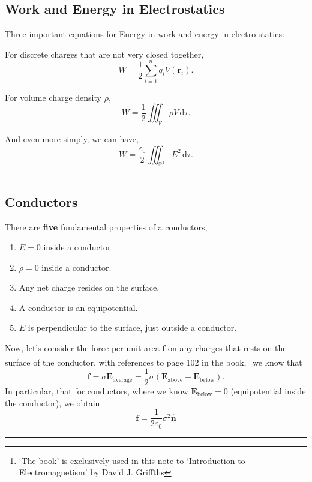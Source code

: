 \documentclass[a4paper]{article}
\newcommand{\dmr}[1]{\, \mathrm{d}#1} %
\numberwithin{equation}{subsection}
\let\oldhat\hat
\renewcommand{\vec}[1]{\mathbf{#1}}
\renewcommand{\hat}[1]{\oldhat{\mathbf{#1}}}
\begin{document}
\subsection{Work and Energy in Electrostatics}
Three important equations for Energy in work and energy in electro statics:
\par For discrete charges that are not very closed together,
\begin{equation}
    W = \frac{1}{2} \sum_{i = 1}^{n}q_i V(\vec{r}_i).
\end{equation}
\par For volume charge density $\rho$, 
\begin{equation}
    W = \frac12 \iiint_{\mathcal{V}} \rho V \dmr{\tau}.
\end{equation}
\par And even more simply, we can have,
\begin{equation}
    W = \frac{\varepsilon_0}{2}\iiint_{\mathbb{R}^3}E^2\dmr{\tau}.
\end{equation}

\par\noindent\rule{\textwidth}{0.4pt}
\subsection{Conductors}
There are \textbf{five} fundamental properties of a conductors,
\begin{enumerate}
    \item $E = 0$ inside a conductor.
    \item $\rho = 0$ inside a conductor.
    \item Any net charge resides on the surface.
    \item A conductor is an equipotential.
    \item $E$ is perpendicular to the surface, just outside a conductor.
\end{enumerate}

Now, let's consider the force per unit area $\vec{f}$ on any charges that rests on the surface of the conductor, with references to page 102 in the book,\footnote{`The book' is exclusively used in this note to `Introduction to Electromagnetism' by David J. Griffths} we know that
\begin{equation}
    \vec{f} = \sigma \vec{E}_{\text{average}} = \frac12 \sigma (\vec{E}_{\text{above}}-\vec{E}_{\text{below}}).
\end{equation}
In particular, that for conductors, where we know $\vec{E}_{\text{below}} = 0$ (equipotential inside the conductor), we obtain 
\begin{equation}
    \vec{f} = \frac{1}{2\varepsilon_0}\sigma^2 \hat{n}
\end{equation} 
\par\noindent\rule{\textwidth}{0.4pt}
\end{document}
